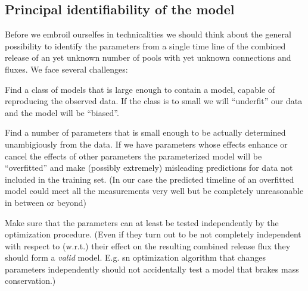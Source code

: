 \documentclass[a4paper]{article}\usepackage[]{graphicx}\usepackage[]{color}
\begin{document}
\subsection{Principal identifiability of the model}
Before we embroil ourselfes in technicalities we should think about the general possibility to identify the parameters from a single time line of the combined release of an yet unknown number of pools with yet unknown connections and fluxes.
We face several challenges:
\begin{emumerate}
\item 
	\label{accuracy} Find a class of models that is large enough to contain a model, capable of reproducing the observed data. If the class is to small we will ``underfit'' our data and the model will be ``biased''.
\item 
	\label{identifiability} Find a number of parameters that is small enough to be actually determined unambigiously from the data. If we have parameters whose effects enhance or cancel the effects of other parameters the parameterized model will be ``overfitted'' and make (possibly extremely) misleading predictions for data not included in the training set. (In our case the predicted timeline of an overfitted model could meet all the measurements very well but be completely unreasonable in between or beyond)
\item 
	\label{independence} Make sure that the parameters can at least be tested independently by the optimization procedure. (Even if they turn out to be not completely independent with respect to (w.r.t.) their effect on the resulting combined release flux they should form a \emph{valid} model. E.g. sn optimization algorithm that changes parameters independently should not accidentally test a model that brakes mass conservation.)
\end{emumerate}
\end{document}
